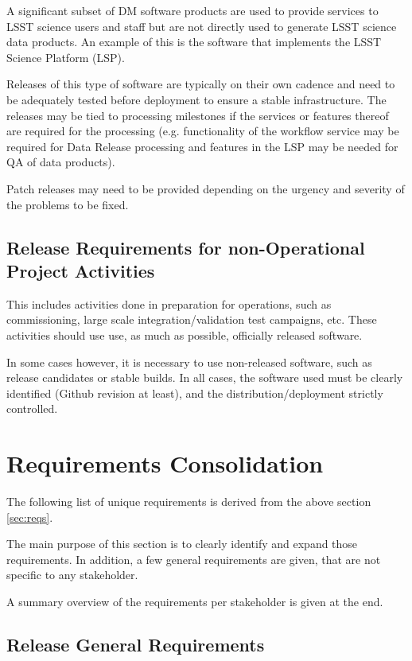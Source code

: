 A significant subset of \gls{DM} software products are used to provide services to \gls{LSST} science users and staff but are not directly used to generate \gls{LSST} science data products. An example of this is the software that implements the \gls{LSST} \gls{Science Platform} (\gls{LSP}).

Releases of this type of software are typically on their own cadence and need to be adequately tested before deployment to ensure a stable infrastructure. 
The releases may be tied to processing milestones if the services or features thereof are required for the processing (e.g. functionality of the workflow service may be required for \gls{Data Release} processing and features in the \gls{LSP} may be needed for \gls{QA} of data products).

Patch releases may need to be provided depending on the urgency and severity of the problems to be fixed.


\subsection{Release Requirements for non-Operational Project Activities} \label{sec:nonopsreqs}

This includes activities done in preparation for operations, such as commissioning, 
large scale integration/validation test campaigns, etc. These activities should use use,  as much as possible,  officially released software.

In some cases however, it is necessary to use non-released software, such as release candidates or stable builds.
In all cases, the software used must be clearly identified (Github revision at least), and the distribution/deployment strictly controlled.


\newpage
\section{Requirements Consolidation} \label{sec:reqdef}

The following list of unique requirements is derived from the above section \ref{sec:reqs}.

The main purpose of this section is to clearly identify and expand those requirements.
In addition, a few general requirements are given, that are not specific to any stakeholder.

A summary overview of the requirements per stakeholder is given at the end.


\subsection{Release General Requirements} \label{sec:genreq}

